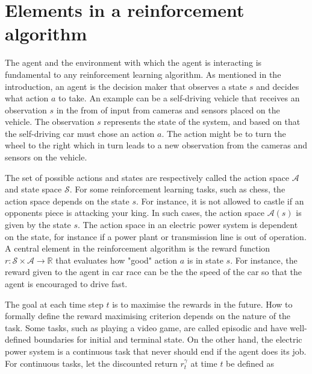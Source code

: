 \documentclass[class=book, crop=false]{standalone}
\begin{document}
\section{Elements in a reinforcement algorithm}

The agent and the environment with which the agent is interacting is fundamental to any reinforcement learning algorithm. As mentioned in the introduction, an agent is the decision maker that observes a state $s$ and decides what action $a$ to take. An example can be a self-driving vehicle that receives an observation $s$ in the from of input from cameras and sensors placed on the vehicle. The observation $s$ represents the state of the system, and based on that the self-driving car must chose an action $a$. The action might be to turn the wheel to the right which in turn leads to a new observation from the cameras and sensors on the vehicle.

The set of possible actions and states are respectively called the action space $\mathcal{A}$ and state space $\mathcal{S}$. For some reinforcement learning tasks, such as chess, the action space depends on the state $s$. For instance, it is not allowed to castle if an opponents piece is attacking your king. In such cases, the action space $\mathcal{A}(s)$ is given by the state $s$. The action space in an electric power system is dependent on the state, for instance if a power plant or transmission line is out of operation. A central element in the reinforcement algorithm is the reward function $r: \mathcal{S} \times \mathcal{A} \to \mathbb{R}$ that evaluates how "good" action $a$ is in state $s$. For instance, the reward given to the agent in car race can be the the speed of the car so that the agent is encouraged to drive fast.

The goal at each time step $t$ is to maximise the rewards in the future. How to formally define the reward maximising criterion depends on the nature of the task. Some tasks, such as playing a video game, are called episodic and have well-defined boundaries for initial and terminal state. On the other hand, the electric power system is a continuous task that never should end if the agent does its job. For continuous tasks, let the discounted return $r^{\gamma}_{t}$ at time $t$ be defined as 
\end{document}
